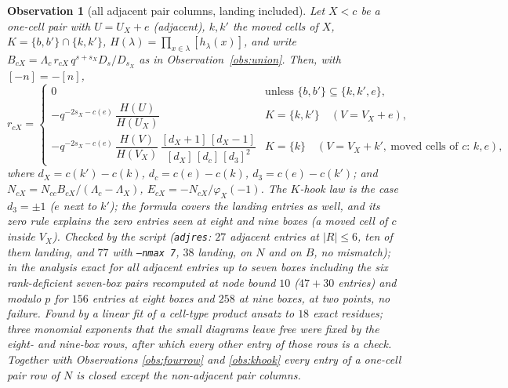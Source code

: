 \documentclass[11pt]{article}
\newtheorem{observation}{Observation}
\newcommand{\Lam}{\Lambda}
\newcommand{\LMPH}[1]{\texttt{#1}}
\begin{document}
\begin{observation}[all adjacent pair columns, landing included]\label{obs:adjres}
Let $X<c$ be a one-cell pair with $U=U_X+e$ (adjacent), $k,k'$ the moved cells of $X$, $K=\{b,b'\}\cap\{k,k'\}$,
$H(\lambda)=\prod_{x\in\lambda}[h_\lambda(x)]$, and write $B_{cX}=\Lam_c\,r_{cX}\,q^{s+s_X}D_s/D_{s_X}$ as in
Observation~\ref{obs:union}.  Then, with $[-n]=-[n]$,
\begin{equation}\label{eq:adjres}
r_{cX}=\begin{cases}
0 & \text{unless }\{b,b'\}\subseteq\{k,k',e\},\\[2pt]
-q^{-2s_X-c(e)}\,\dfrac{H(U)}{H(U_X)} & K=\{k,k'\}\quad(V=V_X+e),\\[8pt]
-q^{-2s_X-c(e)}\,\dfrac{H(V)}{H(V_X)}\,\dfrac{[d_X+1]\,[d_X-1]}{[d_X]\,[d_c]\,[d_3]^2} & K=\{k\}\quad(V=V_X+k',\ \text{moved cells of $c$: }k,e),
\end{cases}
\end{equation}
where $d_X=c(k')-c(k)$, $d_c=c(e)-c(k)$, $d_3=c(e)-c(k')$; and $N_{cX}=N_{cc}B_{cX}/(\Lam_c-\Lam_X)$,
$E_{cX}=-N_{cX}/\varphi_X(-1)$.  The $K$-hook law is the case $d_3=\pm1$ ($e$ next to $k'$); the formula covers the
landing entries as well, and its zero rule explains the zero entries seen at eight and nine boxes (a moved cell of
$c$ inside $V_X$).  Checked by the script (\LMPH{adjres}: $27$ adjacent entries at $|R|\le6$, ten of them landing,
and $77$ with \LMPH{--nmax 7}, $38$ landing, on $N$ and on $B$, no mismatch); in the analysis exact for all adjacent
entries up to seven boxes including the six rank-deficient seven-box pairs recomputed at node bound $10$ ($47+30$
entries) and modulo $p$ for $156$ entries at eight boxes and $258$ at nine boxes, at two points, no failure.  Found by
a linear fit of a cell-type product ansatz to $18$ exact residues; three monomial exponents that the small diagrams
leave free were fixed by the eight- and nine-box rows, after which every other entry of those rows is a check.
Together with Observations \ref{obs:fourrow} and \ref{obs:khook} every entry of a one-cell pair row of $N$ is closed
except the non-adjacent pair columns.
\end{observation}
\end{document}
